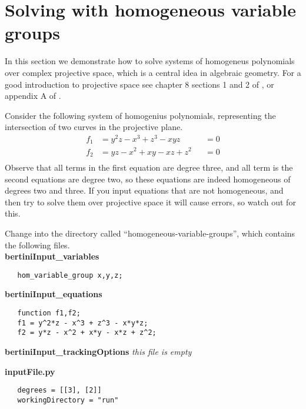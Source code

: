 \documentclass[12pt]{article}
\theoremstyle{definition}
\begin{document}
\section{Solving with homogeneous variable groups}
In this section we demonstrate how to solve systems of homogeneus 
polynomials over complex projective space, which is a central idea in 
algebraic geometry. For a good introduction to 
projective space see chapter 8 sections 1 and 2 of \cite{cox}, or 
appendix A of \cite{silverman}.

Consider the following system of homogenius polynomials, representing 
the intersection of two curves in the projective plane.
\begin{align*}
   f_1 &= y^2z - x^3 + z^3 - xyz &&= 0\\
   f_2 &= yz - x^2 + xy - xz + z^2 &&= 0\\
\end{align*}
Observe that all terms in the first equation are degree three, and all 
term is the second equations are degree two, so these equations are 
indeed homogeneous of degrees two and three. If you input equations that 
are not homogeneous, and then try to solve them over projective space it 
will cause errors, so watch out for this.

Change into the directory 
called ``homogeneous-variable-groups'', which contains the following 
files.\\

\noindent \textbf{bertiniInput\_variables}
\begin{leftbar}
\vspace{-10pt} 
\begin{verbatim}
   hom_variable_group x,y,z;
\end{verbatim}\vspace{-10pt} 
\end{leftbar}

\noindent \textbf{bertiniInput\_equations}
\begin{leftbar}
\vspace{-10pt} 
\begin{verbatim}
   function f1,f2;
   f1 = y^2*z - x^3 + z^3 - x*y*z;
   f2 = y*z - x^2 + x*y - x*z + z^2;
\end{verbatim}\vspace{-10pt} 
\end{leftbar}

\noindent \textbf{bertiniInput\_trackingOptions}
\emph{this file is empty}

\noindent \textbf{inputFile.py}
\begin{leftbar}
\vspace{-10pt} 
\begin{verbatim}
   degrees = [[3], [2]]
   workingDirectory = "run" 
\end{verbatim}\vspace{-10pt} 
\end{leftbar}
\end{document}
